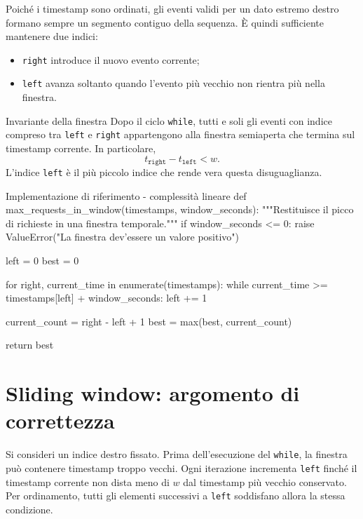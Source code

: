 Poiché i timestamp sono ordinati, gli eventi validi per un dato estremo
destro formano sempre un segmento contiguo della sequenza. È quindi
sufficiente mantenere due indici:

\begin{itemize}
  \item \texttt{right} introduce il nuovo evento corrente;
  \item \texttt{left} avanza soltanto quando l'evento più vecchio non rientra
        più nella finestra.
\end{itemize}

\begin{principlebox}{Invariante della finestra}
Dopo il ciclo \texttt{while}, tutti e soli gli eventi con indice compreso tra
\texttt{left} e \texttt{right} appartengono alla finestra semiaperta che
termina sul timestamp corrente. In particolare,
\[
t_{\texttt{right}}-t_{\texttt{left}} < w.
\]
L'indice \texttt{left} è il più piccolo indice che rende vera questa
disuguaglianza.
\end{principlebox}

\begin{efficientcode}{Implementazione di riferimento - complessità lineare}
def max_requests_in_window(timestamps, window_seconds):
    """Restituisce il picco di richieste in una finestra temporale."""
    if window_seconds <= 0:
        raise ValueError("La finestra dev'essere un valore positivo")

    left = 0
    best = 0

    for right, current_time in enumerate(timestamps):
        while current_time >= timestamps[left] + window_seconds:
            left += 1

        current_count = right - left + 1
        best = max(best, current_count)

    return best
\end{efficientcode}

\section{Sliding window: argomento di correttezza}

Si consideri un indice destro fissato. Prima dell'esecuzione del
\texttt{while}, la finestra può contenere timestamp troppo vecchi. Ogni
iterazione incrementa \texttt{left} finché il timestamp corrente non dista
meno di $w$ dal timestamp più vecchio conservato. Per ordinamento, tutti gli
elementi successivi a \texttt{left} soddisfano allora la stessa condizione.


